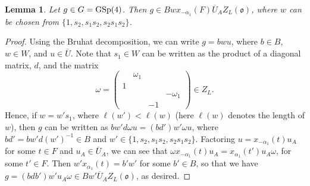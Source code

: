 \documentclass[11pt,letterpaper]{article}
\newcommand{\goth}{\mathfrak}
\newcommand{\GSp}{\textup{GSp}}
\newtheorem{Lemma}[Theorem]{Lemma}
\theoremstyle{remark}
\numberwithin{equation}{section}
\begin{document}
\begin{Lemma}\label{lemma:bruhat}
Let $g \in G=\GSp(4)$. Then $g \in Bwx_{-\alpha_1}(F)\overline{U}_AZ_L(\goth{o})$, where $w$ can be chosen from $\{1,s_2,s_1s_2,s_2s_1s_2\}$.
\end{Lemma}
\begin{proof}
Using the Bruhat decomposition, we can write $g =bwu$, where $b \in B$, $w \in W$, and $u \in \overline{U}$. Note that $s_1 \in W$ can be written as the product of a diagonal matrix, $d$, and the matrix $$\omega = \begin{pmatrix} & \omega_1 & & \\ 1 & & & \\ & & & -\omega_1 \\ & & -1 & \end{pmatrix}  \in Z_L.$$ Hence, if $w = w's_1$, where $\ell(w')< \ell(w)$ (here $\ell(w)$ denotes the length of $w$), then $g$ can be written as $bw'd\omega u = (bd')w'\omega u$, where $bd' = bw'd(w')^{-1} \in B$ and $w' \in \{1,s_2,s_1s_2, s_2s_1s_2\}$. Factoring $u = x_{-\alpha_1}(t)u_A$ for some $t \in F$ and $u_A \in \overline{U}_A$, we can see that $\omega x_{-\alpha_1}(t)u_A =  x_{\alpha_1}(t')u_A\omega$, for some $t' \in F$. Then $w'x_{\alpha_1}(t) = b'w'$ for some $b' \in B$, so that we have $g = (bdb')w'u_A\omega \in Bw'\overline{U}_AZ_L(\goth{o})$, as desired.

\end{proof}
\end{document}
